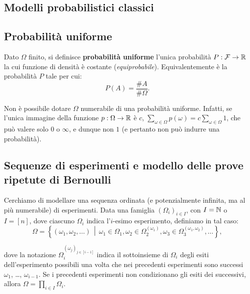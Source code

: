\begin{multicols*}{2}
\section{Modelli probabilistici classici}

\subsection{Probabilità uniforme}

\begin{definition}
    Dato $\Omega$ finito, si definisce
    \textbf{probabilità uniforme} l'unica probabilità
    $P : \mathcal{F} \to \mathbb{R}$ la cui funzione di densità
    è costante (\textit{equiprobabile}). Equivalentemente è la probabilità
    $P$ tale per cui:
    \[
        P(A) = \frac{\#A}{\#\Omega}.
    \]
\end{definition}

\begin{remark}
    Non è possibile dotare $\Omega$ numerabile di una probabilità
    uniforme. Infatti, se l'unica immagine della funzione $p : \Omega \to \mathbb{R}$ è
    $c$, $\sum_{\omega \in \Omega} p(\omega) = c \sum_{\omega \in \Omega} 1$, che
    può valere solo $0$ o $\infty$, e dunque non $1$ (e pertanto non può indurre
    una probabilità).
\end{remark}

\subsection{Sequenze di esperimenti e modello delle prove ripetute di Bernoulli}

    Cerchiamo di modellare una sequenza ordinata (e potenzialmente infinita,
    ma al più numerabile)
    di esperimenti. Data una famiglia $(\Omega_i)_{i \in I}$, con $I = \mathbb{N}$ o
    $I = [n]$, dove ciascuno $\Omega_i$ indica l'$i$-esimo esperimento, definiamo
    in tal caso:
    \[ 
        \Omega = \left\{ (\omega_1, \omega_2, \ldots) \,\middle\vert\, \omega_1 \in \Omega_1, \omega_2 \in \Omega_2^{(\omega_1)}, \omega_3 \in \Omega_3^{(\omega_1, \omega_2)}, \ldots\right\},
    \]

    dove la notazione $\Omega_i^{(\omega_j)_{j \in [i-1]}}$ indica il sottoinsieme
    di $\Omega_i$ degli esiti dell'esperimento possibili una volta che nei precedenti
    esperimenti sono successi $\omega_1$, \ldots, $\omega_{i-1}$. Se i precedenti
    esperimenti non condizionano gli esiti dei successivi, allora
    $\Omega = \prod_{i \in I} \Omega_i$. \medskip



\end{multicols*}
